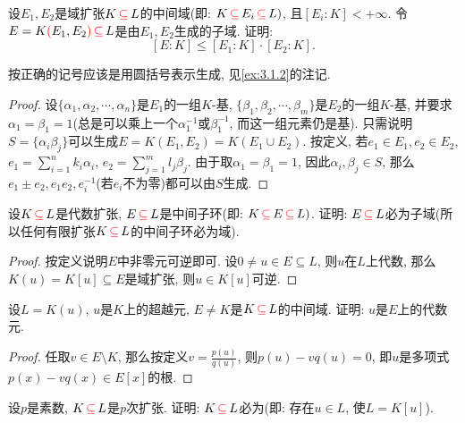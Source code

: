 \begin{problem}\label{ex:3.1.8}
    设$E_1, E_2$是域扩张$K \,\textcolor{red}{\subseteq}\, L$的中间域(即: $K \,\textcolor{red}{\subseteq}\, E_i \,\textcolor{red}{\subseteq}\, L)$, 且$[E_i:K] < +\infty$. 令$E = K\textcolor{red}{(}E_1,E_2\textcolor{red}{)} \,\textcolor{red}{\subseteq}\, L$是由$E_1, E_2$生成的子域. 证明:
    \[
        [E:K] \leqslant [E_1:K] \cdot [E_2:K].
    \]
\end{problem}

\begin{remark}
    按正确的记号应该是用圆括号表示生成, 见\ref{ex:3.1.2}的注记.
\end{remark}

\begin{proof}
    设$\{\alpha_1, \alpha_2, \cdots, \alpha_n\}$是$E_1$的一组$K$-基, $\{\beta_1, \beta_2, \cdots, \beta_m\}$是$E_2$的一组$K$-基, 并要求$\alpha_1 = \beta_1 = 1$(总是可以乘上一个$\alpha_1^{-1}$或$\beta_1^{-1}$, 而这一组元素仍是基). 只需说明$S = \{\alpha_i\beta_j\}$可以生成$E = K(E_1, E_2) = K(E_1 \cup E_2)$. 按定义, 若$e_1 \in E_1, e_2 \in E_2$, $e_1 = \sum_{i = 1}^{n} k_i\alpha_i$, $e_2 = \sum_{j = 1}^{m} l_j\beta_j$. 由于取$\alpha_1 = \beta_1 = 1$, 因此$\alpha_i, \beta_j \in S$, 那么$e_1 \pm e_2, e_1e_2, e_i^{-1}$(若$e_i$不为零)都可以由$S$生成.
\end{proof}

\begin{problem}
    设$K \,\textcolor{red}{\subseteq}\, L$是代数扩张, $E \,\textcolor{red}{\subseteq}\, L$是中间子环(即: $K \,\textcolor{red}{\subseteq}\, E \,\textcolor{red}{\subseteq}\, L)$. 证明: $E \,\textcolor{red}{\subseteq}\, L$必为子域(所以任何有限扩张$K \,\textcolor{red}{\subseteq}\, L$的中间子环必为域).
\end{problem}

\begin{proof}
    按定义说明$E$中非零元可逆即可. 设$0 \neq u \in E \subseteq L$, 则$u$在$L$上代数, 那么$K(u) = K[u] \subseteq E$是域扩张, 则$u \in K[u]$可逆.
\end{proof}

\begin{problem}
    设$L = K(u)$, $u$是$K$上的超越元, $E \neq K$是$K \,\textcolor{red}{\subseteq}\, L$的中间域. 证明: $u$是$E$上的代数元.
\end{problem}

\begin{proof}
    任取$v \in E \setminus K$, 那么按定义$v = \frac{p(u)}{q(u)}$, 则$p(u) - vq(u) = 0$, 即$u$是多项式$p(x) - vq(x) \in E[x]$的根.
\end{proof}

\begin{problem}
    设$p$是素数, $K \,\textcolor{red}{\subseteq}\, L$是$p$次扩张. 证明: $K \,\textcolor{red}{\subseteq}\, L$必为(即: 存在$u \in L$, 使$L = K[u]$).
\end{problem}


